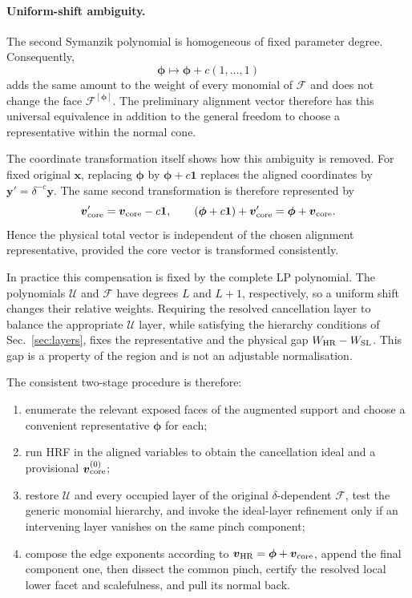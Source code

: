 \documentclass[a4paper,11pt]{article}
\newcommand{\x}{\boldsymbol{x}}
\newcommand{\HR}{\mathrm{HR}}
\newcommand{\WSL}{W_{\rm SL}}
\newcommand{\WHR}{W_{\rm HR}}
\begin{document}
\paragraph{Uniform-shift ambiguity.}

The second Symanzik polynomial is homogeneous of fixed parameter degree.
Consequently,
\begin{equation}
 \boldsymbol\phi\longmapsto
 \boldsymbol\phi+c(1,\ldots,1)
\label{eq:uniformshift}
\end{equation}
adds the same amount to the weight of every monomial of \(\mathcal F\) and
does not change the face \(\mathcal F^{[\boldsymbol\phi]}\).  The preliminary alignment
vector therefore has this universal equivalence in addition to the general
freedom to choose a representative within the normal cone.

The coordinate transformation itself shows how this ambiguity is removed.
For fixed original \(\x\), replacing
\(\boldsymbol\phi\) by \(\boldsymbol\phi+c\boldsymbol1\) replaces the aligned
coordinates by \(\boldsymbol y'=\delta^{-c}\boldsymbol y\).  The same second
transformation is therefore represented by
\begin{equation}
 \boldsymbol v_{\rm core}' = \boldsymbol v_{\rm core}-c\boldsymbol1,
 \qquad
 (\boldsymbol\phi+c\boldsymbol1)+\boldsymbol v_{\rm core}'
 =\boldsymbol\phi+\boldsymbol v_{\rm core}.
 \label{eq:shift-covariant-composition}
\end{equation}
Hence the physical total vector is independent of the chosen alignment
representative, provided the core vector is transformed consistently.

In practice this compensation is fixed by the complete LP polynomial.
The polynomials \(\mathcal U\) and \(\mathcal F\) have degrees \(L\) and
\(L+1\), respectively, so a uniform shift changes their relative weights.
Requiring the resolved cancellation layer to balance the appropriate
\(\mathcal U\) layer, while satisfying the hierarchy conditions of
Sec.~\ref{sec:layers}, fixes
the representative and the physical gap \(\WHR-\WSL\).  This gap is a
property of the region and is not an adjustable normalisation.

The consistent two-stage procedure is therefore:
\begin{enumerate}[label=(\roman*)]
 \item enumerate the relevant exposed faces of the augmented support and
 choose a convenient representative \(\boldsymbol\phi\) for each;
 \item run HRF in the aligned variables to obtain the cancellation ideal and
 a provisional \(\boldsymbol v_{\rm core}^{(0)}\);
 \item restore \(\mathcal U\) and every occupied layer of the original
 \(\delta\)-dependent \(\mathcal F\), test the generic monomial hierarchy,
 and invoke the ideal-layer refinement only if an intervening layer vanishes
 on the same pinch component;
 \item compose the edge exponents according to
 \(\boldsymbol v_{\HR}=\boldsymbol\phi+\boldsymbol v_{\rm core}\), append the final
 component one, then dissect the common pinch, certify the resolved local
 lower facet and scalefulness, and pull its normal back.
\end{enumerate}
\end{document}
